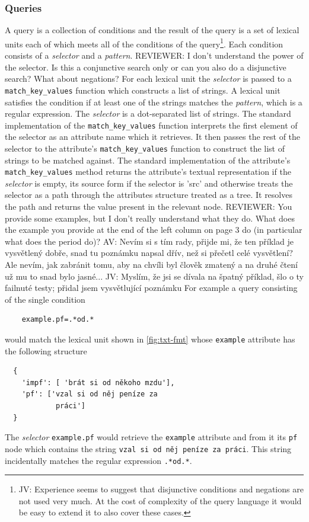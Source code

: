 \documentclass[10pt, a4paper]{article}
\newcommand{\py}[1]{{\tt #1}}
\newcommand{\att}[1]{{\tt #1}}
\newcommand{\av}[1]{{\color{ansa} AV: #1}}
\newcommand{\jv}[1]{{\color{svlinks} JV: #1}}
\newcommand{\rrr}[1]{{\color{red} REVIEWER: #1}}
\begin{document}
\subsubsection{Queries}\label{sec:query}
A query is a collection of conditions
and the result of the query is a set of lexical units each of which meets all
of the conditions of the query\footnote{\jv{Experience seems to suggest that disjunctive conditions
and negations are not used very much. At the cost of complexity of the query language it would
be easy to extend it to also cover these cases.}}. Each condition consists of a \emph{selector} and a
\emph{pattern}.
\rrr{I don't understand the power of the selector. Is this a conjunctive search only or can you also do a disjunctive search? What about negations?}
For each lexical unit the \emph{selector} is passed to a \py{match\_key\_values}
function which constructs a list of strings. A lexical unit satisfies the condition if at
least one of the strings matches the \emph{pattern}, which is a regular expression.
The \emph{selector} is a dot-separated list of strings. The standard implementation of the
\py{match\_key\_values} function interprets the first element of the selector as an attribute
name which it retrieves. It then passes the rest of the selector to the attribute's \py{match\_key\_values}
function to construct the list of strings to be matched against. The standard implementation
of the attribute's \py{match\_key\_values} method returns the attribute's textual representation
if the \emph{selector} is empty, its source form if the selector is 'src' and otherwise treats
the selector as a path through the attributes structure treated as a tree. It resolves the path and returns the
value present in the relevant node.
\rrr{You provide some examples, but I don't really understand what they do. What does the example you provide at the end of the left column on page 3 do (in particular what does the period do)?}
\av{Nevím si s tím rady, přijde mi, že ten příklad je vysvětlený dobře, snad tu poznámku napsal dřív, než si přečetl celé vysvětlení? Ale nevím, jak zabránit tomu, aby na chvíli byl člověk zmatený a na druhé čtení už mu to snad bylo jasné...}
\jv{Myslím, že jsi se dívala na špatný příklad, šlo o ty failnuté testy; přidal jsem vysvětlující poznámku}
For example a query consisting of the single condition
\begin{verbatim}
    example.pf=.*od.*
\end{verbatim}
would match the lexical unit shown in \autoref{fig:txt-fmt} whose \att{example} attribute
has the following structure
\begin{verbatim}
  {
    'impf': [ 'brát si od někoho mzdu'],
    'pf': ['vzal si od něj peníze za
            práci']
  }
\end{verbatim}
The \emph{selector} \att{example.pf} would retrieve the \att{example} attribute and from it
its \att{pf} node which contains the string {\tt vzal si od něj peníze za práci}. This string
incidentally matches the regular expression {\tt .*od.*}.
\end{document}
